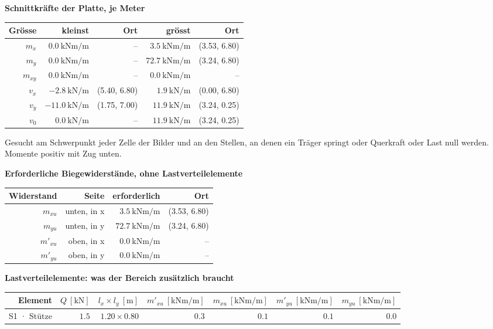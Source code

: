 \documentclass[11pt,a4paper]{article}
\begin{document}
\noindent\textbf{Schnittkräfte der Platte, je Meter}
\begin{longtable}{rrrrr}
\hline
Grösse & kleinst & Ort & grösst & Ort \\
\hline
\endhead
$m_x$ & $0.0\ \mathrm{kNm/m}$ & – & $3.5\ \mathrm{kNm/m}$ & (3.53, 6.80) \\
$m_y$ & $0.0\ \mathrm{kNm/m}$ & – & $72.7\ \mathrm{kNm/m}$ & (3.24, 6.80) \\
$m_{xy}$ & $0.0\ \mathrm{kNm/m}$ & – & $0.0\ \mathrm{kNm/m}$ & – \\
$v_x$ & $-2.8\ \mathrm{kN/m}$ & (5.40, 6.80) & $1.9\ \mathrm{kN/m}$ & (0.00, 6.80) \\
$v_y$ & $-11.0\ \mathrm{kN/m}$ & (1.75, 7.00) & $11.9\ \mathrm{kN/m}$ & (3.24, 0.25) \\
$v_0$ & $0.0\ \mathrm{kN/m}$ & – & $11.9\ \mathrm{kN/m}$ & (3.24, 0.25) \\
\hline
\end{longtable}
Gesucht am Schwerpunkt jeder Zelle der Bilder und an den Stellen, an denen ein Träger springt oder Querkraft oder Last null werden. Momente positiv mit Zug unten.

\noindent\textbf{Erforderliche Biegewiderstände, ohne Lastverteilelemente}
\begin{longtable}{rrrr}
\hline
Widerstand & Seite & erforderlich & Ort \\
\hline
\endhead
$m_{xu}$ & unten, in x & $3.5\ \mathrm{kNm/m}$ & (3.53, 6.80) \\
$m_{yu}$ & unten, in y & $72.7\ \mathrm{kNm/m}$ & (3.24, 6.80) \\
$m'_{xu}$ & oben, in x & $0.0\ \mathrm{kNm/m}$ & – \\
$m'_{yu}$ & oben, in y & $0.0\ \mathrm{kNm/m}$ & – \\
\hline
\end{longtable}
\noindent\textbf{Lastverteilelemente: was der Bereich zusätzlich braucht}
\begin{longtable}{rrrrrrr}
\hline
Element & $Q\ [\mathrm{kN}]$ & $l_x \times l_y\ [\mathrm{m}]$ & $m'_{xu}\ [\mathrm{kNm/m}]$ & $m_{xu}\ [\mathrm{kNm/m}]$ & $m'_{yu}\ [\mathrm{kNm/m}]$ & $m_{yu}\ [\mathrm{kNm/m}]$ \\
\hline
\endhead
S1 · Stütze & $1.5$ & $1.20 \times 0.80$ & $0.3$ & $0.1$ & $0.1$ & $0.0$ \\
\hline
\end{longtable}
\end{document}
